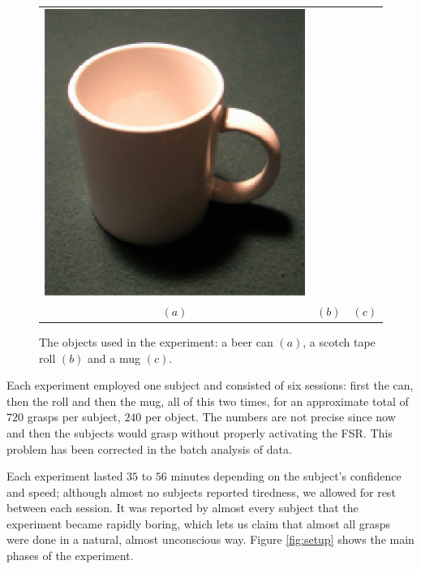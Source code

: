 \begin{figure}[htbp]
\begin{center}
\begin{tabular}{ccc}
      \includegraphics[height=0.2\textheight]{mug.eps} \\
      $(a)$ & $(b)$ & $(c)$
    \end{tabular}
    \caption{The objects used in the experiment: a beer can $(a)$, a
    scotch tape roll $(b)$ and a mug $(c)$.}
    \label{fig:objects}
  \end{center}
\end{figure}

Each experiment employed one subject and consisted of six sessions:
first the can, then the roll and then the mug, all of this two times,
for an approximate total of $720$ grasps per subject, $240$ per
object. The numbers are not precise since now and then the subjects
would grasp without properly activating the FSR. This problem has been
corrected in the batch analysis of data.

Each experiment lasted $35$ to $56$ minutes depending on the subject's
confidence and speed; although almost no subjects reported tiredness,
we allowed for rest between each session. It was reported by almost
every subject that the experiment became rapidly boring, which lets us
claim that almost all grasps were done in a natural, almost
unconscious way. Figure \ref{fig:setup} shows the main phases of the
experiment.


